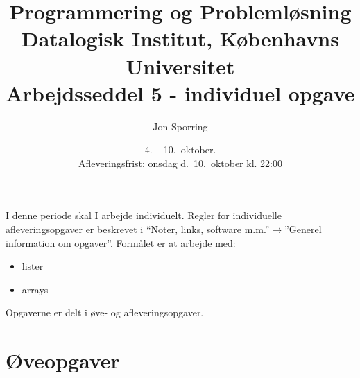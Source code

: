 \documentclass[a4paper,12pt]{article}
\title{Programmering og Problemløsning\\Datalogisk Institut,
  Københavns Universitet\\Arbejdsseddel 5 - individuel opgave}
\author{Jon Sporring}
\date{4.\ - 10.\ oktober.\\Afleveringsfrist: onsdag d.\ 10.\ oktober kl. 22:00}
\begin{document}
\maketitle

\noindent
I denne periode skal I arbejde individuelt. Regler for individuelle afleveringsopgaver er beskrevet i ``Noter, links, software m.m.''$\rightarrow$''Generel information om opgaver''. Formålet er at arbejde med:
\begin{itemize}
\item lister
\item arrays
\end{itemize}

Opgaverne er delt i øve- og afleveringsopgaver. 

\section*{Øveopgaver}
\end{document}
